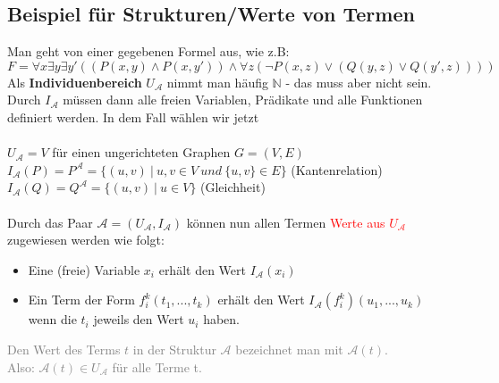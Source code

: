 \documentclass{article}
\begin{document}
	\subsection{Beispiel für Strukturen/Werte von Termen}
	Man geht von einer gegebenen Formel aus, wie z.B:
	\[F = \forall x \exists y \exists y' ((P(x,y)\wedge P(x,y'))\wedge \forall z (\neg P(x,z)\vee(Q(y,z)\vee Q(y',z))))\]
	Als \textbf{Individuenbereich} $U_\mathcal{A}$ nimmt man häufig $\mathbb{N}$ - das muss aber nicht sein. \\
	Durch $I_\mathcal{A}$ müssen dann alle freien Variablen, Prädikate und alle Funktionen definiert werden. In dem Fall wählen wir jetzt \\
	\\
	$U_\mathcal{A} = V$ für einen ungerichteten Graphen $G = (V,E)$ \\
	$I_\mathcal{A}(P) = P^\mathcal{A} = \{(u,v) \:|\: u,v \in V \: und \: \{u,v\}\in E\}$ (Kantenrelation)\\
	$I_\mathcal{A}(Q) = Q^\mathcal{A} = \{(u,v) \:|\: u \in V\}$  (Gleichheit) \\
	\\
	Durch das Paar $\mathcal{A} = (U_\mathcal{A}, I_\mathcal{A})$ können nun allen Termen \textcolor{red}{Werte aus $U_\mathcal{A}$} zugewiesen werden wie folgt:
	\begin{itemize}
		\item Eine (freie) Variable $x_i$ erhält den Wert $I_\mathcal{A}(x_i)$
		\item Ein Term der Form $f^k_i(t_1,..., t_k)$ erhält den Wert $I_\mathcal{A}(f^k_i)(u_1,...,u_k)$ \\
		wenn die $t_i$ jeweils den Wert $u_i$ haben.
	\end{itemize}
	\textcolor{gray}{
		Den Wert des Terms $t$ in der Struktur $\mathcal{A}$ bezeichnet man mit $\mathcal{A}(t)$. \\
		Also: $\mathcal{A}(t) \in U_\mathcal{A}$ für alle Terme t.
	} \\
\end{document}
